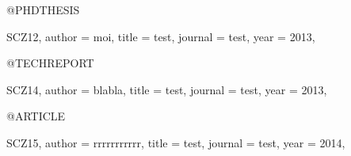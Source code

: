 @PHDTHESIS{SCZ12,
  author =       moi,
  title =        test,
  journal =      test,
  year =         2013,

}

@TECHREPORT{SCZ14,
  author =       blabla,
  title =        test,
  journal =      test,
  year =         2013,

}

@ARTICLE{SCZ15,
  author =       rrrrrrrrrrr,
  title =        test,
  journal =      test,
  year =         2014,

}


